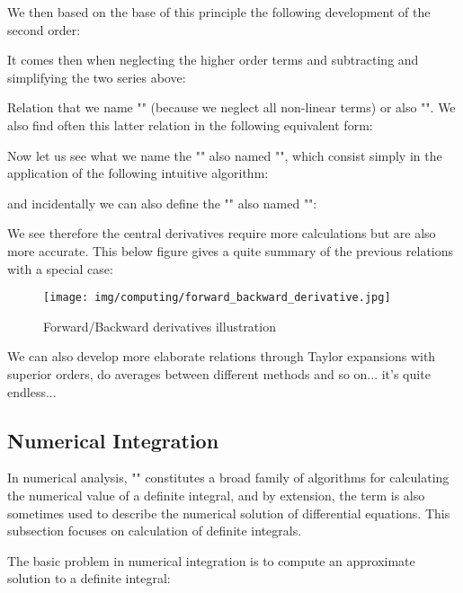 	We then based on the base of this principle the following development of the second order:
	
	It comes then when neglecting the higher order terms and subtracting and simplifying the two series above:
	
	Relation that we name "" (because we neglect all non-linear terms) or also "". We also find often this latter relation in the following equivalent form:
	
	Now let us see what we name the "" also named "", which consist simply in the application of the following intuitive  algorithm:
	
	and incidentally we can also define the "" also named "":
	
	We see therefore the central derivatives require more calculations but are also more accurate. This below figure gives a quite summary of the previous relations with a special case:
	\begin{figure}[H]
		\centering
		\texttt{[image: img/computing/forward\_backward\_derivative.jpg]}
		\caption{Forward/Backward derivatives illustration}
	\end{figure}
	We can also develop more elaborate relations through Taylor expansions with superior orders, do averages between different methods and so on... it's quite endless...
	
	\pagebreak
	\subsection{Numerical Integration}\label{numerical integration}
	In numerical analysis, "" constitutes a broad family of algorithms for calculating the numerical value of a definite integral, and by extension, the term is also sometimes used to describe the numerical solution of differential equations. This subsection focuses on calculation of definite integrals. 
	
	The basic problem in numerical integration is to compute an approximate solution to a definite integral:
	
